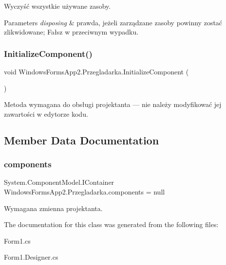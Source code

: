 Wyczyść wszystkie używane zasoby. 


\begin{DoxyParams}{Parameters}
{\em disposing} & prawda, jeżeli zarządzane zasoby powinny zostać zlikwidowane; Fałsz w przeciwnym wypadku.\\
\hline
\end{DoxyParams}
\mbox{\label{class_windows_forms_app2_1_1_przegladarka_a16d94dcbfce3b5319ae8b36f0d9fe26b}} 
\subsubsection{\texorpdfstring{Initialize\+Component()}{InitializeComponent()}}
{\footnotesize\ttfamily void Windows\+Forms\+App2.\+Przegladarka.\+Initialize\+Component (\begin{DoxyParamCaption}{ }\end{DoxyParamCaption})\hspace{0.3cm}{\ttfamily [private]}}



Metoda wymagana do obsługi projektanta — nie należy modyfikować jej zawartości w edytorze kodu. 



\subsection{Member Data Documentation}
\mbox{\label{class_windows_forms_app2_1_1_przegladarka_a37fd573e6d383f202dbea9da1940a947}} 
\subsubsection{\texorpdfstring{components}{components}}
{\footnotesize\ttfamily System.\+Component\+Model.\+I\+Container Windows\+Forms\+App2.\+Przegladarka.\+components = null\hspace{0.3cm}{\ttfamily [private]}}



Wymagana zmienna projektanta. 



The documentation for this class was generated from the following files\+:\begin{DoxyCompactItemize}
\item 
Form1.\+cs\item 
Form1.\+Designer.\+cs\end{DoxyCompactItemize}
